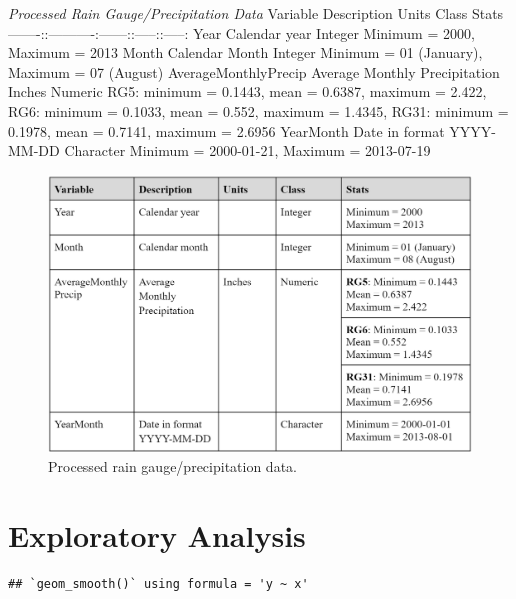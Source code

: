 \documentclass[
  12pt,
]{article}
\begin{document}
\emph{Processed Rain Gauge/Precipitation Data} \textbar Variable
\textbar{} Description \textbar{} Units \textbar{} Class \textbar{}
Stats
\textbar-------:\textbar:----------:\textbar------:\textbar:-----:\textbar:-----:\textbar{}
\textbar Year\textbar{} Calendar year \textbar{} \textbar{} Integer
\textbar{} Minimum = 2000, Maximum = 2013\textbar{}
\textbar Month\textbar{} Calendar Month \textbar{} \textbar{} Integer
\textbar{} Minimum = 01 (January), Maximum = 07 (August)\textbar{}
\textbar AverageMonthlyPrecip\textbar{} Average Monthly Precipitation
\textbar{} Inches \textbar{} Numeric \textbar{} RG5: minimum = 0.1443,
mean = 0.6387, maximum = 2.422, RG6: minimum = 0.1033, mean = 0.552,
maximum = 1.4345, RG31: minimum = 0.1978, mean = 0.7141, maximum =
2.6956 \textbar{} \textbar YearMonth\textbar{} Date in format YYYY-MM-DD
\textbar{} \textbar{} Character \textbar{} Minimum = 2000-01-21, Maximum
= 2013-07-19\textbar{}

\begin{figure}
\centering
\includegraphics{../Data/PrecipitationTable.png}
\caption{Processed rain gauge/precipitation data.}
\end{figure}

\newpage

\hypertarget{exploratory-analysis}{%
\section{Exploratory Analysis}\label{exploratory-analysis}}

\begin{verbatim}
## `geom_smooth()` using formula = 'y ~ x'
\end{verbatim}
\end{document}
